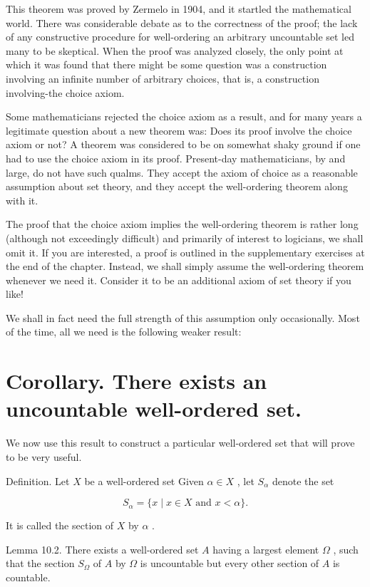 This theorem was proved by Zermelo in 1904, and it startled the mathematical world. There was considerable debate as to the correctness of the proof; the lack of any constructive procedure for well-ordering an arbitrary uncountable set led many to be skeptical. When the proof was analyzed closely, the only point at which it was found that there might be some question was a construction involving an infinite number of arbitrary choices, that is, a construction involving-the choice axiom.

Some mathematicians rejected the choice axiom as a result, and for many years a legitimate question about a new theorem was: Does its proof involve the choice axiom or not? A theorem was considered to be on somewhat shaky ground if one had to use the choice axiom in its proof. Present-day mathematicians, by and large, do not have such qualms. They accept the axiom of choice as a reasonable assumption about set theory, and they accept the well-ordering theorem along with it.

The proof that the choice axiom implies the well-ordering theorem is rather long (although not exceedingly difficult) and primarily of interest to logicians, we shall omit it. If you are interested, a proof is outlined in the supplementary exercises at the end of the chapter. Instead, we shall simply assume the well-ordering theorem whenever we need it. Consider it to be an additional axiom of set theory if you like!

We shall in fact need the full strength of this assumption only occasionally. Most of the time, all we need is the following weaker result:

\section*{Corollary. There exists an uncountable well-ordered set.}

We now use this result to construct a particular well-ordered set that will prove to be very useful.

Definition. Let \(X\) be a well-ordered set Given \(\alpha  \in  X\) , let \({S}_{\alpha }\) denote the set

\[
{S}_{\alpha } = \{ x \mid  x \in  X\text{ and }x < \alpha \} .
\]

It is called the section of \(X\) by \(\alpha\) .

Lemma 10.2. There exists a well-ordered set \(A\) having a largest element \(\Omega\) , such that the section \({S}_{\Omega }\) of \(A\) by \(\Omega\) is uncountable but every other section of \(A\) is countable.

